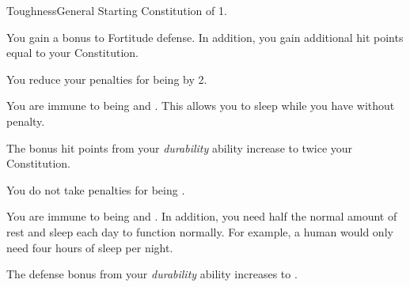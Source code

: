     \begin{feat}{Toughness}{General}
        \featpre Starting Constitution of 1.

         You gain a  bonus to Fortitude defense.
        In addition, you gain additional hit points equal to your Constitution.

         You reduce your penalties for being  by 2.

         You are immune to being  and .
        This allows you to sleep while you have  without penalty.

         The bonus hit points from your \textit{durability} ability increase to twice your Constitution.

         You do not take penalties for being .

         You are immune to being  and .
        In addition, you need half the normal amount of rest and sleep each day to function normally.
        For example, a human would only need four hours of sleep per night.

         The defense bonus from your \textit{durability} ability increases to .
    \end{feat}


